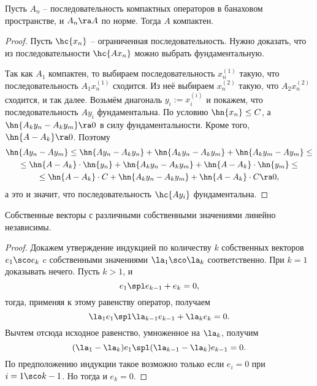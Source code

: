 \documentclass[a4paper]{article}
\newcommand{\n}[1]{^{(#1)}}
\begin{document}
\begin{theorem}
Пусть $A_n$ -- последовательность компактных операторов в банаховом пространстве, и $A_n \ra A$ по норме.
Тогда $A$ компактен.
\end{theorem}
\begin{proof}
Пусть $\hc{x_n}$ -- ограниченная последовательность. Нужно доказать, что
из последовательности $\hc{Ax_n}$ можно выбрать фундаментальную.

Так как $A_1$ компактен, то выбираем последовательность $x_n\n1$ такую, что
последовательность $A_1 x_n\n1$ сходится. Из неё выбираем $x_n\n2$ такую, что $A_2x_n\n2$ сходится,
и так далее. Возьмём диагональ $y_i := x_i\n i$ и покажем, что последовательность $Ay_i$ фундаментальна.
По условию $\hn{x_n} \le C$, а $\hn{A_k y_n - A_k y_m} \ra 0$ в силу фундаментальности.
Кроме того, $\hn{A - A_k} \ra 0$. Поэтому
\begin{multline*}
\hn{Ay_n-Ay_m} \le \hn{A y_n-A_k y_n} + \hn{A_k y_n - A_k y_m} + \hn{A_k y_m - A y_m} \le \\ \le
\hn{A-A_k}\cdot\hn{y_n} + \hn{A_k y_n - A_k y_m} + \hn{A-A_k}\cdot\hn{y_m}\le \\ \le
\hn{A-A_k}\cdot C + \hn{A_k y_n - A_k y_m} + \hn{A-A_k}\cdot C \ra 0,
\end{multline*}
а это и значит, что последовательность $\hc{A y_i}$ фундаментальна.
\end{proof}

\begin{lemma}
Собственные векторы с различными собственными значениями линейно независимы.
\end{lemma}
\begin{proof}
Докажем утверждение индукцией по количеству $k$ собственных векторов $e_1\sco e_k$ c собственными
значениями $\la_1\sco \la_k$ соответственно. При $k = 1$ доказывать нечего.
Пусть $k > 1$, и
$$e_1\spl e_{k-1} + e_k = 0,$$
тогда, применяя к этому равенству оператор, получаем
$$\la_1e_1\spl \la_{k-1}e_{k-1} + \la_k e_k = 0.$$
Вычтем отсюда исходное равенство, умноженное на $\la_k$, получим
$$(\la_1-\la_k)e_1\spl (\la_{k-1}-\la_k)e_{k-1} = 0.$$
По предположению индукции такое возможно только если
$e_i = 0$ при $i = 1\sco k-1$. Но тогда и $e_k = 0$.
\end{proof}
\end{document}
